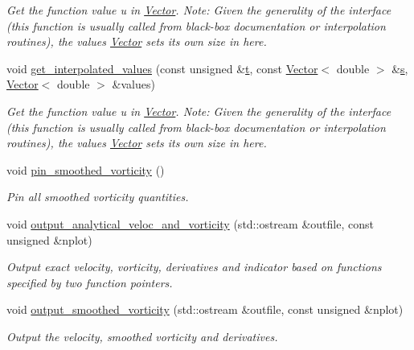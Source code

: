 \begin{DoxyCompactItemize}
\begin{DoxyCompactList}\small\item\em Get the function value u in \hyperlink{classoomph_1_1Vector}{Vector}. Note\+: Given the generality of the interface (this function is usually called from black-\/box documentation or interpolation routines), the values \hyperlink{classoomph_1_1Vector}{Vector} sets its own size in here. \end{DoxyCompactList}\item 
void \hyperlink{classoomph_1_1VorticitySmootherElement_ab1ee981ddf465edc8a55bf281ce073c7}{get\+\_\+interpolated\+\_\+values} (const unsigned \&\hyperlink{cfortran_8h_af6f0bd3dc13317f895c91323c25c2b8f}{t}, const \hyperlink{classoomph_1_1Vector}{Vector}$<$ double $>$ \&\hyperlink{cfortran_8h_ab7123126e4885ef647dd9c6e3807a21c}{s}, \hyperlink{classoomph_1_1Vector}{Vector}$<$ double $>$ \&values)
\begin{DoxyCompactList}\small\item\em Get the function value u in \hyperlink{classoomph_1_1Vector}{Vector}. Note\+: Given the generality of the interface (this function is usually called from black-\/box documentation or interpolation routines), the values \hyperlink{classoomph_1_1Vector}{Vector} sets its own size in here. \end{DoxyCompactList}\item 
void \hyperlink{classoomph_1_1VorticitySmootherElement_acdb04c3f47fd5de9e56a7443e7469a1f}{pin\+\_\+smoothed\+\_\+vorticity} ()
\begin{DoxyCompactList}\small\item\em Pin all smoothed vorticity quantities. \end{DoxyCompactList}\item 
void \hyperlink{classoomph_1_1VorticitySmootherElement_ac0a831db4c42647732e231bbbcbe756e}{output\+\_\+analytical\+\_\+veloc\+\_\+and\+\_\+vorticity} (std\+::ostream \&outfile, const unsigned \&nplot)
\begin{DoxyCompactList}\small\item\em Output exact velocity, vorticity, derivatives and indicator based on functions specified by two function pointers. \end{DoxyCompactList}\item 
void \hyperlink{classoomph_1_1VorticitySmootherElement_aa2c5f7342ea784ae47a706524b63bafb}{output\+\_\+smoothed\+\_\+vorticity} (std\+::ostream \&outfile, const unsigned \&nplot)
\begin{DoxyCompactList}\small\item\em Output the velocity, smoothed vorticity and derivatives. \end{DoxyCompactList}\item 

\end{DoxyCompactItemize}

